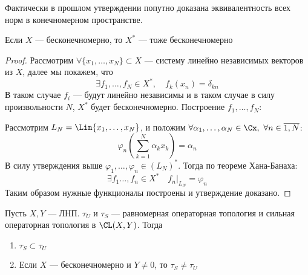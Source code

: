 Фактически в прошлом утверждении попутно доказана эквивалентность всех норм в конечномерном пространстве.
\begin{claim}
	Если $X$ --- бесконечномерно, то $X^*$ --- тоже бесконечномерно
\end{claim}
\begin{proof}
	Рассмотрим $\forall \{x_1, \dots, x_N\} \subset X$ --- систему линейно независимых векторов из $X$, далее мы покажем, что 
	$$
	\exists f_1, \dots, f_N \in X^*, \quad f_k(x_n) = \delta_{kn}
	$$
	В таком случае $f_i$ --- будут линейно независимы и в таком случае в силу произвольности $N$, $X^*$ будет бесконечномерно.
	Построение $f_1, \dots, f_N$: 
	
	Рассмотрим $L_N = \Lin\{x_1, \dots, x_N\}$, и положим $\forall \alpha_1, \dots, \alpha_N \in \Cx, \ \forall n \in \overline{1, N}$:
	$$
	\varphi_n\left(\sum_{k=1}^{N}\alpha_k x_k\right) = \alpha_n
	$$
	В силу утверждения выше $\varphi_1, \dots, \varphi_n \in (L_N)^*$. Тогда по теореме Хана-Банаха: 
	$$
	\exists f_1 \dots, f_n \in X^* \quad f_n|_{L_N} = \varphi_n
	$$
	Таким образом нужные функционалы построены и утверждение доказано.
\end{proof}
\begin{claim}
	Пусть $X,Y$ --- ЛНП. $\tau_U$ и $\tau_S$ --- равномерная операторная топология и сильная операторная топология в $\CL(X, Y)$. Тогда
	\begin{enumerate}
		\item $\tau_S \subset \tau_U$
		\item Если $X$ --- бесконечномерно и $Y \neq 0$, то $\tau_S \neq \tau_U$
	\end{enumerate}
\end{claim}
